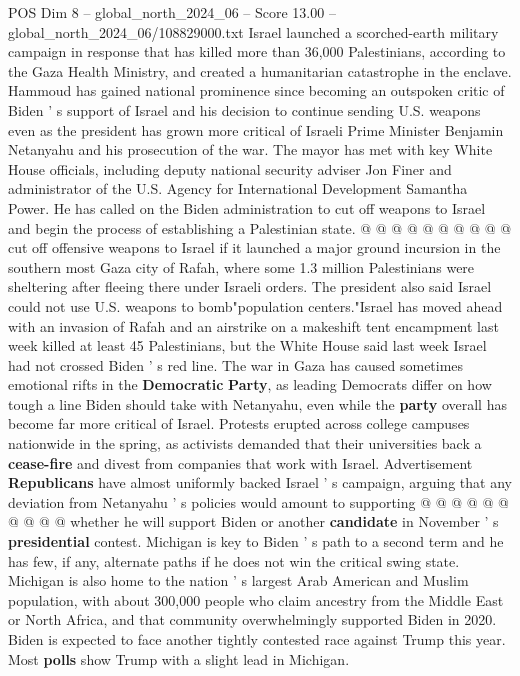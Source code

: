 \begin{textsample}{POS Dim 8 – global\_north\_2024\_06 – Score 13.00 – global\_north\_2024\_06/108829000.txt}
Israel launched a scorched-earth military campaign in response that has killed more than 36,000 Palestinians, according to the Gaza Health Ministry, and created a humanitarian catastrophe in the enclave.
Hammoud has gained national prominence since becoming an outspoken critic of Biden ' s support of Israel and his decision to continue sending U.S. weapons even as the president has grown more critical of Israeli Prime Minister Benjamin Netanyahu and his prosecution of the war.
The mayor has met with key White House officials, including deputy national security adviser Jon Finer and administrator of the U.S.
Agency for International Development Samantha Power.
He has called on the Biden administration to cut off weapons to Israel and begin the process of establishing a Palestinian state. @ @ @ @ @ @ @ @ @ @ cut off offensive weapons to Israel if it launched a major ground incursion in the southern most Gaza city of Rafah, where some 1.3 million Palestinians were sheltering after fleeing there under Israeli orders.
The president also said Israel could not use U.S. weapons to bomb"population centers."Israel has moved ahead with an invasion of Rafah and an airstrike on a makeshift tent encampment last week killed at least 45 Palestinians, but the White House said last week Israel had not crossed Biden ' s red line.
The war in Gaza has caused sometimes emotional rifts in the \textbf{Democratic} \textbf{Party}, as leading Democrats differ on how tough a line Biden should take with Netanyahu, even while the \textbf{party} overall has become far more critical of Israel.
Protests erupted across college campuses nationwide in the spring, as activists demanded that their universities back a \textbf{cease-fire} and divest from companies that work with Israel.
Advertisement \textbf{Republicans} have almost uniformly backed Israel ' s campaign, arguing that any deviation from Netanyahu ' s policies would amount to supporting @ @ @ @ @ @ @ @ @ @ whether he will support Biden or another \textbf{candidate} in November ' s \textbf{presidential} contest.
Michigan is key to Biden ' s path to a second term and he has few, if any, alternate paths if he does not win the critical swing state.
Michigan is also home to the nation ' s largest Arab American and Muslim population, with about 300,000 people who claim ancestry from the Middle East or North Africa, and that community overwhelmingly supported Biden in 2020.
Biden is expected to face another tightly contested race against Trump this year.
Most \textbf{polls} show Trump with a slight lead in Michigan.

\end{textsample}
